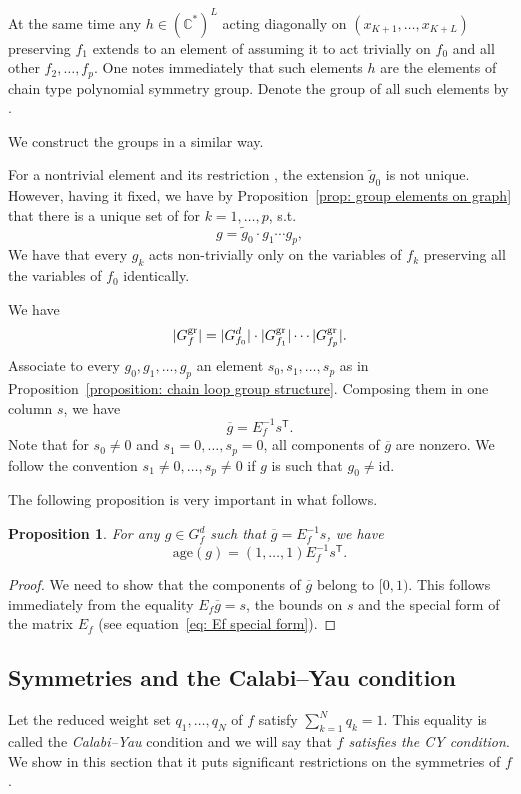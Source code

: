 \documentclass[10pt,a4paper]{amsart}
\numberwithin{equation}{section}
\newtheorem{Proposition}[Theorem]{Proposition}
 { \theoremstyle{definition}
\newtheorem{Definition}[Theorem]{Definition}
\newtheorem{Note}[Theorem]{Note}
\newtheorem{Example}[Theorem]{Example}
\newtheorem{Remark}[Theorem]{Remark} }
\newcommand{\CC}{{\mathbb{C}}}
\newcommand{\id}{\mathrm{id}}
\newcommand{\age}{\mathrm{age}}
\begin{document}
At the same time any $h \in (\CC^\ast)^{L}$ acting diagonally on $(x_{K+1},\dots,x_{K+L})$ preserving $f_1$ extends to an element of  assuming it to act trivially on $f_0$ and all other $f_2,\dots,f_p$. One notes immediately that such elements $h$ are the elements of chain type polynomial symmetry group. Denote the group of all such elements by .

We construct the groups  in a similar way.

For a nontrivial element  and its restriction , the extension $\widetilde g_0$ is not unique. However, having it fixed, we have by Proposition~\ref{prop: group elements on graph} that there is a unique set of  for $k=1,\dots,p$, s.t.
\[
	g = \widetilde g_0\cdot g_1 \cdots g_p,
\]
We have that every $g_k$ acts non-trivially only on the variables of $f_k$ preserving all the variables of $f_0$ identically.

We have
\[
	|G_f^{\rm gr}| = |G_{f_0}^d|\cdot |G_{f_1}^{\rm gr}| \cdots |G_{f_p}^{\rm gr}|.
\]
Associate to every $g_0,g_1,\dots,g_p$ an element $s_0,s_1,\dots,s_p$ as in Proposition~\ref{proposition: chain loop group structure}. Composing them in one column $s$, we have
\[
	\overline g = E_f^{-1} s^{\mathsf{T}}.
\]
Note that for $s_0 \neq 0$ and $s_1=0, \dots, s_p =0$, all components of $\overline g$ are nonzero. We follow the convention $s_1 \neq 0, \dots, s_p \neq 0$ if $g$ is such that $g_0 \neq \id$.

The following proposition is very important in what follows.

\begin{Proposition}\label{prop: age by matrix}
	For any $g \in G_f^d$ such that $\overline g = E_f^{-1} s$, we have
	\[
	\age(g) = (1,\dots,1) E_f^{-1} s^{\mathsf{T}}.
	\]
\end{Proposition}
\begin{proof}
	We need to show that the components of $\overline g$ belong to $[0,1)$. This follows immediately from the equality $E_f \overline g = s$, the bounds on $s$ and the special form of the matrix $E_f$ (see equation~\eqref{eq: Ef special form}).
\end{proof}

\subsection{Symmetries and the Calabi--Yau condition}\label{section: symmetries under CY}
Let the reduced weight set $q_1,\dots,q_N$ of $f$ satisfy $\sum_{k=1}^N q_k = 1$. This equality is called the \textit{Calabi--Yau} condition and we will say that \textit{$f$ satisfies the CY condition}. We show in this section that it puts significant restrictions on the symmetries of $f$.
\end{document}
